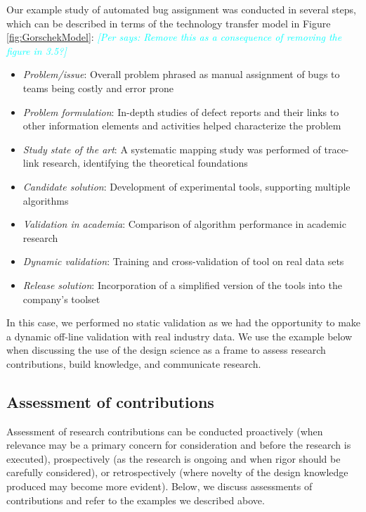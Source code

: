 \documentclass[graybox]{svmult}
\newcommand{\per}[1]{\textcolor{cyan}{{\it [Per says: #1]}}}
\newcommand{\per}[1]{}
\begin{document}
Our example study of automated bug assignment was conducted in several steps, which can be described in terms of the technology transfer model in Figure \ref{fig:GorschekModel}: \per{Remove this as a consequence of removing the figure in 3.5?}
\begin{itemize}
\item \emph{Problem/issue}: Overall problem phrased as manual assignment of bugs to teams being costly and error prone
\item \emph{Problem formulation}: In-depth studies of defect reports and their links to other information elements and activities helped characterize the problem
\item \emph{Study state of the art}: A systematic mapping study was performed of trace-link research, identifying the theoretical foundations \cite{Borg2013EMSE}
\item \emph{Candidate solution}: Development of experimental tools, supporting multiple algorithms
\item \emph{Validation in academia}: Comparison of algorithm performance in academic research \cite{BorgESEM13}
\item \emph{Dynamic validation}: Training and cross-validation of tool on real data sets \cite{JonssonBug15}
\item \emph{Release solution}: Incorporation of a simplified version of the tools into the company's toolset
\end{itemize} 

In this case, we performed no static validation as we had the opportunity to make a dynamic off-line validation with real industry data. We use the example below when discussing the use of the design science as a frame to assess research contributions, build knowledge, and communicate research.



\subsection{Assessment of contributions}
\label{sec:assessment}

Assessment of research contributions can be conducted proactively (when relevance may be a primary concern for consideration and before the research is executed), prospectively (as the research is ongoing and when rigor should be carefully considered), or retrospectively (where novelty of the design knowledge produced may become more evident).
Below, we discuss assessments of contributions and refer to the examples we described above.
\end{document}
